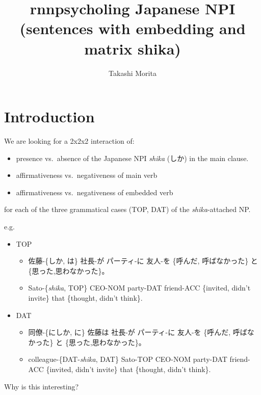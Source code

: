 \documentclass[]{ltjsarticle}
\title{rnnpsycholing Japanese NPI (sentences with embedding and matrix shika)}
\author{Takashi Morita}
\date{}
\providecommand{\tightlist}{%
  \setlength{\itemsep}{0pt}\setlength{\parskip}{0pt}}
\begin{document}
\maketitle

{
\setcounter{tocdepth}{3}
\tableofcontents
}
\section{Introduction}\label{introduction}

We are looking for a 2x2x2 interaction of:

\begin{itemize}
\tightlist
\item
  presence vs.~absence of the Japanese NPI \emph{shika} (しか) in the
  main clause.
\item
  affirmativeness vs.~negativeness of main verb
\item
  affirmativeness vs.~negativeness of embedded verb
\end{itemize}

for each of the three grammatical cases (TOP, DAT) of the
\emph{shika}-attached NP.

e.g.

\begin{itemize}
\tightlist
\item
  TOP

  \begin{itemize}
  \tightlist
  \item
    佐藤-\{しか, は\} 社長-が パーティ-に 友人-を \{呼んだ,
    呼ばなかった\} と \{思った,思わなかった\}。
  \item
    Sato-\{\emph{shika}, TOP\} CEO-NOM party-DAT friend-ACC \{invited,
    didn't invite\} that \{thought, didn't think\}.
  \end{itemize}
\item
  DAT

  \begin{itemize}
  \tightlist
  \item
    同僚-\{にしか, に\} 佐藤は 社長-が パーティ-に 友人-を \{呼んだ,
    呼ばなかった\} と \{思った,思わなかった\}。
  \item
    colleague-\{DAT-\emph{shika}, DAT\} Sato-TOP CEO-NOM party-DAT
    friend-ACC \{invited, didn't invite\} that \{thought, didn't
    think\}.
  \end{itemize}
\end{itemize}

Why is this interesting?
\end{document}
